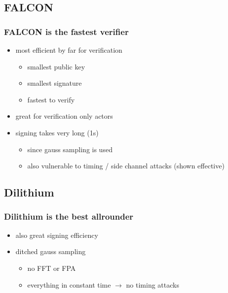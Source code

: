\documentclass[ucs,10pt]{beamer}
\begin{document}
\subsection{FALCON}
\begin{frame}
  \frametitle{FALCON is the fastest verifier}

  \begin{itemize}
    \item most efficient by far for verification 
    \begin{itemize}
      \item smallest public key
      \item smallest signature
      \item fastest to verify
    \end{itemize}
    \item great for verification only actors
    \item signing takes very long (1s)
    \begin{itemize}
      \item since gauss sampling is used
      \item also vulnerable to timing / side channel attacks (shown effective)
    \end{itemize}
  \end{itemize}

\end{frame}

\subsection{Dilithium}
\begin{frame}
  \frametitle{Dilithium is the best allrounder}

  \begin{itemize}
    \item also great signing efficiency 
    \item ditched gauss sampling
    \begin{itemize}
      \item no FFT or FPA 
      \item everything in constant time $\rightarrow$ no timing attacks
    \end{itemize}
  \end{itemize}

\end{frame}
\end{document}
